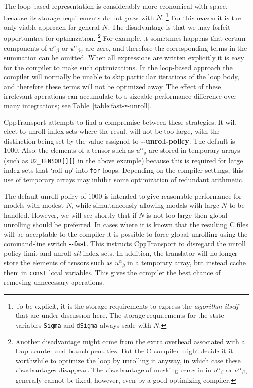 \documentclass[11pt,a4paper]{article}
\newcommand{\packagefont}{\sffamily}
\newcommand{\CppTransport}{{\packagefont CppTransport}}
\newcommand{\option}[1]{{\ttfamily\bfseries\small #1}}
\newcommand\CC{C\nolinebreak\hspace{-.05em}\raisebox{.4ex}{\relsize{-3}{\textbf{+}}}\nolinebreak\hspace{-.10em}\raisebox{.4ex}{\relsize{-3}{\textbf{+}}}}
\begin{document}
\begin{itemize}
    The loop-based representation is considerably more economical with space,
    because its storage requirements do not grow with $N$.%
        \footnote{To be explicit, it is the storage requirements to
        express the \emph{algorithm itself} that are under discussion
        here. The storage requirements for the state variables
        \texttt{Sigma} and \texttt{dSigma}
        always scale with $N$.}
    For this reason
    it is the only viable approach for general $N$.
    The disadvantage is that we may forfeit opportunities
    for optimization.%
    	\footnote{Another disadvantage might come from
    	the extra overhead associated with a loop counter
    	and branch penalties. But the {\CC} compiler might
    	decide it it worthwhile to
    	optimize the loop by unrolling it anyway, in which
    	case these disadvantages disappear.
    	The disadvantage of masking zeros in
    	in ${u^\alpha}_\beta$ or ${u^\alpha}_{\beta\gamma}$
    	generally cannot be fixed, however, even by a good
    	optimizing compiler.}
    For example, it sometimes happens that
    certain components of ${u^\alpha}_\beta$
    or ${u^\alpha}_{\beta\gamma}$ are zero,
    and therefore the corresponding terms in the summation
    can be omitted.
    When all expressions are written explicitly
    it is easy for the compiler to make such
    optimizations.   
    In the loop-based approach
    the compiler will normally be unable to
    skip particular iterations of the loop body,
    and therefore these terms will not be optimized away.
    The effect of these irrelevant operations
    can accumulate to a sizeable performance
    difference over many integrations;
    see Table~\ref{table:fast-v-unroll}.
\end{itemize}

{\CppTransport} attempts to find a compromise between these
strategies.
It will elect to unroll index sets where the result will not
be too large,
with
the distinction being set by the value assigned to
\option{{-}{-}unroll-policy}. The default is 1000.
Also,
the elements of a tensor such as ${u^\alpha}_\beta$
are stored in temporary arrays (such as
\texttt{U2_TENSOR[][]} in the above example)
because this is required for
large index sets that `roll up' into
\texttt{for}-loops.
Depending on the compiler settings, this use
of temporary arrays may inhibit some
optimization of redundant arithmetic.

The default unroll policy of 1000 is intended to give reasonable
performance for models with modest $N$, while simultaneously
allowing models with large $N$ to be handled.
However, we will see shortly
that if $N$ is not too large then global unrolling should be preferred.
In cases where it is known that the resulting {\CC} files will be
acceptable to the compiler it is possible to force global
unrolling using the command-line switch
\option{{-}{-}fast}. This instructs
{\CppTransport} to disregard the unroll policy limit and unroll
\emph{all} index sets.
In addition, the translator will no longer store the elements of tensors such as
${u^\alpha}_\beta$ in a temporary array, but instead cache them
in \texttt{const} local variables.
This gives the compiler the best chance of removing unnecessary operations.
\end{document}
